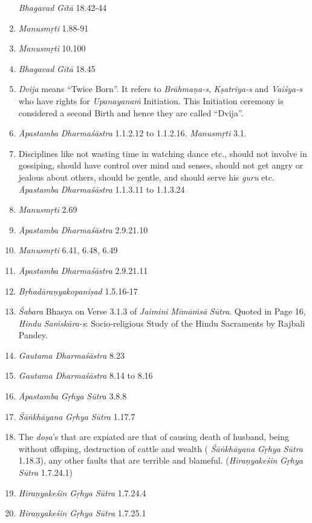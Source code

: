 \begin{enumerate}
  \emph{Bhagavad} \emph{Gītā} 18.42-44
\item
  \emph{Manusmṛti} 1.88-91
\item
  \emph{Manusmṛti} 10.100
\item
  \emph{Bhagavad} \emph{Gītā} 18.45
\item
  \emph{Dvija} means ``Twice Born''. It refers to \emph{Brāhmaṇa-s}, \emph{Kṣatriya-s} and \emph{Vaiśya-s} who have rights for \emph{Upanayanaṁ} Initiation. This Initiation ceremony is considered a second Birth and hence they are called ``Dvija''.
\item
  \emph{Āpastamba} \emph{Dharmaśāstra} 1.1.2.12 to 1.1.2.16. \emph{Manusmṛti} 3.1.
\item
  Disciplines like not wasting time in watching dance etc., should not involve in gossiping, should have control over mind and senses, should not get angry or jealous about others, should be gentle, and should serve his \emph{guru} etc. \emph{Āpastamba} \emph{Dharmaśāstra} 1.1.3.11 to 1.1.3.24
\item
  \emph{Manusmṛti} 2.69
\item
  \emph{Āpastamba} \emph{Dharmaśāstra} 2.9.21.10
\item
  \emph{Manusmṛti} 6.41, 6.48, 6.49
\item
  \emph{Āpastamba} \emph{Dharmaśāstra} 2.9.21.11
\item
  \emph{Bṛhadāraṇyakopaniṣad} 1.5.16-17
\item
  \emph{Śabara} Bhasya on Verse 3.1.3 of \emph{Jaimini} \emph{Mīmāṁsā} \emph{Sūtra}. Quoted in Page 16, \emph{Hindu} \emph{Saṁskāra-s}: Socio-religious Study of the Hindu Sacraments by Rajbali Pandey.
\item
  \emph{Gautama} \emph{Dharmaśāstra} 8.23
\item
  \emph{Gautama} \emph{Dharmaśāstra} 8.14 to 8.16
\item
  \emph{Āpastamba} \emph{Gṛhya} \emph{Sūtra} 3.8.8
\item
  \emph{Śāṅkhāyana} \emph{Gṛhya} \emph{Sūtra} 1.17.7
\item
  The \emph{doṣa}'s that are expiated are that of causing death of husband, being without offsping, destruction of cattle and wealth ( \emph{Śāṅkhāyana} \emph{Gṛhya} \emph{Sūtra} 1.18.3), any other faults that are terrible and blameful. (\emph{Hiraṇyakeśin} \emph{Gṛhya} \emph{Sūtra} 1.7.24.1)
\item
  \emph{Hiraṇyakeśin} \emph{Gṛhya} \emph{Sūtra} 1.7.24.4
\item
  \emph{Hiraṇyakeśin} \emph{Gṛhya} \emph{Sūtra} 1.7.25.1

\end{enumerate}
